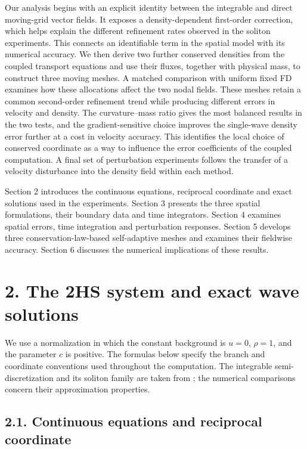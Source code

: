 \documentclass[11pt,a4paper]{article}
\begin{document}
Our analysis begins with an explicit identity between the integrable and direct moving-grid vector fields. It exposes a density-dependent first-order correction, which helps explain the different refinement rates observed in the soliton experiments. This connects an identifiable term in the spatial model with its numerical accuracy. We then derive two further conserved densities from the coupled transport equations and use their fluxes, together with physical mass, to construct three moving meshes. A matched comparison with uniform fixed FD examines how these allocations affect the two nodal fields. These meshes retain a common second-order refinement trend while producing different errors in velocity and density. The curvature--mass ratio gives the most balanced results in the two tests, and the gradient-sensitive choice improves the single-wave density error further at a cost in velocity accuracy. This identifies the local choice of conserved coordinate as a way to influence the error coefficients of the coupled computation. A final set of perturbation experiments follows the transfer of a velocity disturbance into the density field within each method.

Section 2 introduces the continuous equations, reciprocal coordinate and exact solutions used in the experiments. Section 3 presents the three spatial formulations, their boundary data and time integrators. Section 4 examines spatial errors, time integration and perturbation responses. Section 5 develops three conservation-law-based self-adaptive meshes and examines their fieldwise accuracy. Section 6 discusses the numerical implications of these results.

\FloatBarrier
\section*{2. The 2HS system and exact wave solutions}

We use a normalization in which the constant background is \(u=0\), \(\rho=1\), and the parameter \(c\) is positive. The formulas below specify the branch and coordinate conventions used throughout the computation. The integrable semi-discretization and its soliton family are taken from \cite{hori2026}; the numerical comparisons concern their approximation properties.

\FloatBarrier
\subsection*{2.1. Continuous equations and reciprocal coordinate}
\end{document}

